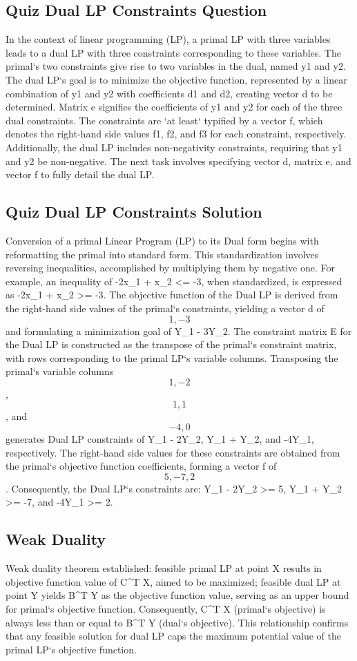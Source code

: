 \subsection*{Quiz  Dual LP Constraints Question}
In the context of linear programming (LP), a primal LP with three variables leads to a dual LP with three constraints corresponding to these variables.
The primal`s two constraints give rise to two variables in the dual, named y1 and y2.
The dual LP`s goal is to minimize the objective function, represented by a linear combination of y1 and y2 with coefficients d1 and d2, creating vector d to be determined.
Matrix e signifies the coefficients of y1 and y2 for each of the three dual constraints.
The constraints are `at least` typified by a vector f, which denotes the right-hand side values f1, f2, and f3 for each constraint, respectively.
Additionally, the dual LP includes non-negativity constraints, requiring that y1 and y2 be non-negative.
The next task involves specifying vector d, matrix e, and vector f to fully detail the dual LP\@.

\subsection*{Quiz  Dual LP Constraints Solution}
Conversion of a primal Linear Program (LP) to its Dual form begins with reformatting the primal into standard form.
This standardization involves reversing inequalities, accomplished by multiplying them by negative one.
For example, an inequality of -2x\_1 + x\_2 \textless{}= -3, when standardized, is expressed as -2x\_1 + x\_2 \textgreater{}= -3.
The objective function of the Dual LP is derived from the right-hand side values of the primal`s constraints, yielding a vector d of \[1, -3\] and formulating a minimization goal of Y\_1 - 3Y\_2.
The constraint matrix E for the Dual LP is constructed as the transpose of the primal`s constraint matrix, with rows corresponding to the primal LP`s variable columns.
Transposing the primal`s variable columns \[1, -2\], \[1, 1\], and \[-4, 0\] generates Dual LP constraints of Y\_1 - 2Y\_2, Y\_1 + Y\_2, and -4Y\_1, respectively.
The right-hand side values for these constraints are obtained from the primal`s objective function coefficients, forming a vector f of \[5, -7, 2\].
Consequently, the Dual LP`s constraints are: Y\_1 - 2Y\_2 \textgreater{}= 5, Y\_1 + Y\_2 \textgreater{}= -7, and -4Y\_1 \textgreater{}= 2.

\subsection*{Weak Duality}
Weak duality theorem established: feasible primal LP at point X results in objective function value of C\textasciicircum{}T X, aimed to be maximized; feasible dual LP at point Y yields B\textasciicircum{}T Y as the objective function value, serving as an upper bound for primal`s objective function.
Consequently, C\textasciicircum{}T X (primal`s objective) is always less than or equal to B\textasciicircum{}T Y (dual`s objective).
This relationship confirms that any feasible solution for dual LP caps the maximum potential value of the primal LP`s objective function.

